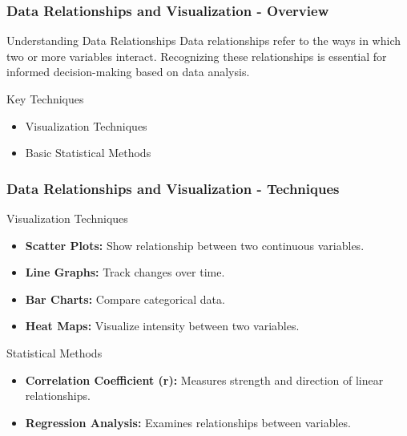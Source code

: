 \documentclass[aspectratio=169]{beamer}
\begin{document}
\begin{frame}[fragile]
    \frametitle{Data Relationships and Visualization - Overview}
    \begin{block}{Understanding Data Relationships}
        Data relationships refer to the ways in which two or more variables interact. Recognizing these relationships is essential for informed decision-making based on data analysis.
    \end{block}
    \begin{block}{Key Techniques}
        \begin{itemize}
            \item Visualization Techniques
            \item Basic Statistical Methods
        \end{itemize}
    \end{block}
\end{frame}

\begin{frame}[fragile]
    \frametitle{Data Relationships and Visualization - Techniques}
    \begin{block}{Visualization Techniques}
        \begin{itemize}
            \item \textbf{Scatter Plots:} Show relationship between two continuous variables. 
            \item \textbf{Line Graphs:} Track changes over time.
            \item \textbf{Bar Charts:} Compare categorical data.
            \item \textbf{Heat Maps:} Visualize intensity between two variables.
        \end{itemize}
    \end{block}
    \begin{block}{Statistical Methods}
        \begin{itemize}
            \item \textbf{Correlation Coefficient (r):} Measures strength and direction of linear relationships.
            \item \textbf{Regression Analysis:} Examines relationships between variables.
        \end{itemize}
    \end{block}
\end{frame}
\end{document}
